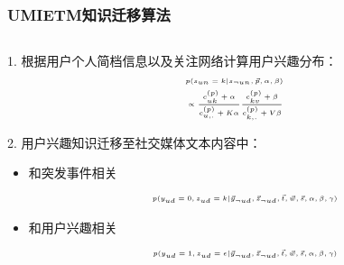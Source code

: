 \begin{frame}
\frametitle{UMIETM知识迁移算法}

\begin{columns}
\begin{column}[T]{0.42\paperwidth}
1. 根据用户个人简档信息以及关注网络计算用户兴趣分布：
\setlength{\abovedisplayskip}{1pt}
\setlength{\belowdisplayskip}{1pt}
\begin{equation}
\tiny
\label{timeUserTagLDAIVsamplingForS}
\begin{aligned}
&p(s_{un}=k|s_{\neg{un}},\vec{p},\alpha,\beta)\\
&\propto \frac{c^{(p)}_{uk}+\alpha}{c^{(p)}_{u,.}+K\alpha}
\frac{c^{(p)}_{kv}+\beta}{c^{(p)}_{k,.}+V\beta}\\
\end{aligned}
\end{equation}

2. 用户兴趣知识迁移至社交媒体文本内容中：
\begin{itemize}
	\item 和突发事件相关 
\begin{align*}
\tiny
\begin{aligned}
&p(y_{ud}=0,z_{ud}=k|\vec{y}_{\neg{ud}},\vec{z}_{\neg{ud}},\vec{t},\vec{w},\vec{s},\alpha,\beta,\gamma)\\
\end{aligned}
\end{align*}
	\item 和用户兴趣相关
\begin{align*}
\tiny
\begin{aligned}
&p(y_{ud}=1,z_{ud}=e|\vec{y}_{\neg{ud}},\vec{z}_{\neg{ud}},\vec{t},\vec{w},\vec{s},\alpha,\beta,\gamma)\\
\end{aligned}
\end{align*}

\end{itemize}

\end{column}


\end{columns}
\end{frame}
